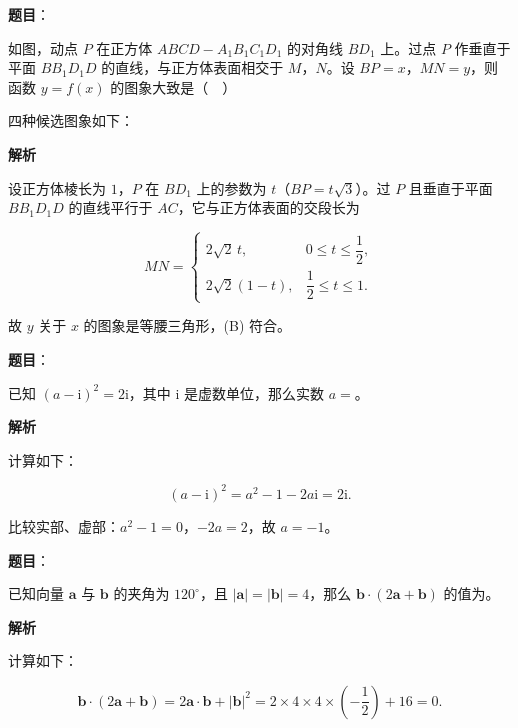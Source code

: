 \begin{answer}

\textbf{题目}：

如图，动点 $P$ 在正方体 $ABCD-A_1B_1C_1D_1$ 的对角线 $BD_1$ 上。过点 $P$ 作垂直于平面 $BB_1D_1D$ 的直线，与正方体表面相交于 $M$，$N$。设 $BP=x$，$MN=y$，则函数 $y=f(x)$ 的图象大致是（　）
\nopagebreak[4]
\begin{center}\end{center}
\nopagebreak[4]
四种候选图象如下：
\nopagebreak[4]
\begin{center}\end{center}
\nopagebreak[4]
\textbf{解析}

设正方体棱长为 $1$，$P$ 在 $BD_1$ 上的参数为 $t$（$BP=t\sqrt3$）。过 $P$ 且垂直于平面 $BB_1D_1D$ 的直线平行于 $AC$，它与正方体表面的交段长为

\nopagebreak[4]
\[MN=\begin{cases}2\sqrt2\,t,&0\leqslant t\leqslant\dfrac12,\\[4pt]2\sqrt2(1-t),&\dfrac12\leqslant t\leqslant1.\end{cases}\]

故 $y$ 关于 $x$ 的图象是等腰三角形，(B) 符合。


\end{answer}
\begin{answer}

\textbf{题目}：

已知 $(a-\mathrm i)^2=2\mathrm i$，其中 $\mathrm i$ 是虚数单位，那么实数 $a=$\gkblank{}。

\textbf{解析}

计算如下：

\nopagebreak[4]
\[(a-\mathrm i)^2=a^2-1-2a\mathrm i=2\mathrm i.\]

比较实部、虚部：$a^2-1=0$，$-2a=2$，故 $a=-1$。


\end{answer}
\begin{answer}

\textbf{题目}：

已知向量 $\boldsymbol a$ 与 $\boldsymbol b$ 的夹角为 $120^\circ$，且 $|\boldsymbol a|=|\boldsymbol b|=4$，那么 $\boldsymbol b\cdot(2\boldsymbol a+\boldsymbol b)$ 的值为\gkblank{}。

\textbf{解析}

计算如下：

\nopagebreak[4]
\[\boldsymbol b\cdot(2\boldsymbol a+\boldsymbol b)=2\boldsymbol a\cdot\boldsymbol b+|\boldsymbol b|^2
=2\times4\times4\times\left(-\frac12\right)+16=0.\]


\end{answer}
